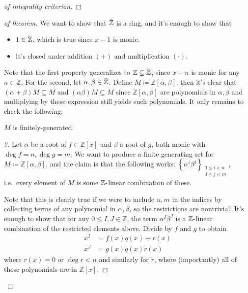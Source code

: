 \begin{proof}[of integrality criterion]
\end{proof}

\begin{proof}[of theorem]

We want to show that
\(\mkern 1.5mu\overline{\mkern-1.5mu{\mathbb{Z}}\mkern-1.5mu}\mkern 1.5mu\)
is a ring, and it's enough to show that

\begin{itemize}
\tightlist
\item
  \(1\in \mkern 1.5mu\overline{\mkern-1.5mu{\mathbb{Z}}\mkern-1.5mu}\mkern 1.5mu\),
  which is true since \(x-1\) is monic.
\item
  It's closed under addition \((+)\) and multiplication \((\cdot)\).
\end{itemize}

Note that the first property generalizes to
\({\mathbb{Z}}\subseteq \mkern 1.5mu\overline{\mkern-1.5mu{\mathbb{Z}}\mkern-1.5mu}\mkern 1.5mu\),
since \(x-n\) is monic for any \(n\in {\mathbb{Z}}\). For the second,
let
\(\alpha, \beta \in \mkern 1.5mu\overline{\mkern-1.5mu{\mathbb{Z}}\mkern-1.5mu}\mkern 1.5mu\).
Define \(M \coloneqq{\mathbb{Z}}[\alpha, \beta]\), then it's clear that
\((\alpha + \beta)M \subseteq M\) and \((\alpha \beta)M \subseteq M\)
since \({\mathbb{Z}}[\alpha, \beta]\) are polynomials in
\(\alpha, \beta\) and multiplying by these expression still yields such
polynomials. It only remains to check the following:

\begin{claim}

\(M\) is finitely-generated.

\end{claim}

\begin{proof}[?]

Let \(\alpha\) be a root of \(f \in {\mathbb{Z}}[x]\) and \(\beta\) a
root of \(g\), both monic with \(\deg f = n, \deg g = m\). We want to
produce a finite generating set for
\(M\coloneqq{\mathbb{Z}}[\alpha, \beta]\), and the claim is that the
following works:
\(\left\{{ \alpha^i \beta^j}\right\} _{\substack{0\leq i < n \\ 0 \leq j < m} }\),
i.e.~every element of \(M\) is some \({\mathbb{Z}}{\hbox{-}}\)linear
combination of these.

\hfill\break

Note that this is clearly true if we were to include \(n, m\) in the
indices by collecting terms of any polynomial in \(\alpha, \beta\), so
the restrictions are nontrivial. It's enough to show that for any
\(0 \leq I, J \in {\mathbb{Z}}\), the term \(\alpha^I \beta^J\) is a
\({\mathbb{Z}}{\hbox{-}}\)linear combination of the restricted elements
above. Divide by \(f\) and \(g\) to obtain
\begin{align*}
x^I &= f(x) q(x) + r(x) \\
x^J &= g(x) \tilde q(x) \tilde r(x)
\end{align*}
where \(r(x) = 0\) or \(\deg r < n\) and similarly for \(\tilde r\),
where (importantly) all of these polynomials are in \({\mathbb{Z}}[x]\).


\end{proof}
\end{proof}
